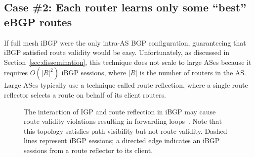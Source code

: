 \subsection{Case \#2: Each router learns only some ``best'' eBGP routes}

If full mesh iBGP were the only intra-AS BGP configuration,
guaranteeing that iBGP satisfied route validity would be easy.
Unfortunately, as discussed in Section~\ref{sec:dissemination}, this
technique does not scale to large ASes because it requires $O(|R|^2)$
iBGP sessions, where $|R|$ is the number of routers in the AS.  Large
ASes typically use a 
technique called route 
reflection, where a single route reflector selects a route on behalf of
its client routers.


\begin{figure}
\begin{center}
\begin{psfrags}
\end{psfrags}
\end{center}
\caption[The interaction of IGP and route reflection may cause
  forwarding loops.]{The interaction of IGP and route reflection in iBGP
  may cause route validity violations resulting in forwarding
  loops~\cite{Dube99}. 
  Note that this topology satisfies path visibility but not route
  validity.  Dashed lines represent iBGP sessions; a directed edge
  indicates an iBGP sessions from a route reflector to its client.}
\label{fig:dube}
\end{figure}


